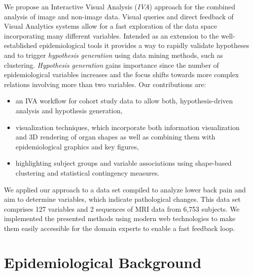 \documentclass[journal]{style/vgtc} 			          %
\begin{document}
We propose an Interactive Visual Analysis (\emph{IVA}) approach \cite{Thomas2005} for the combined analysis of image and non-image data.
%
Visual queries and direct feedback of Visual Analytics systems allow for a fast exploration of the data space incorporating many different variables.
%
Intended as an extension to the well-established epidemiological tools it provides a way to rapidly validate hypotheses and to trigger \emph{hypothesis generation} using data mining methods, such as clustering.
%
\emph{Hypothesis generation} gains importance since the number of epidemiological variables increases and the focus shifts towards more complex relations involving more than two variables. Our contributions are:
\begin{itemize} \itemsep0.1em
	\item an IVA workflow for cohort study data to allow both, hypothesis-driven analysis and hypothesis generation,%
	\item visualization techniques, which incorporate both information visualization and 3D rendering of organ shapes as well as combining them with epidemiological graphics and key figures,
	\item highlighting subject groups and variable associations using shape-based clustering and statistical contingency measures.
\end{itemize}
We applied our approach to a data set compiled to analyze lower back pain and aim to determine variables, which indicate pathological changes.
%
This data set comprises 127 variables and 2 sequences of MRI data from 6,753 subjects.
%
We implemented the presented methods using modern web technologies to make them easily accessible for the domain experts to enable a fast feedback loop.
%

\section{Epidemiological Background} \label{MedicalAndTechnicalBackground}
\end{document}
